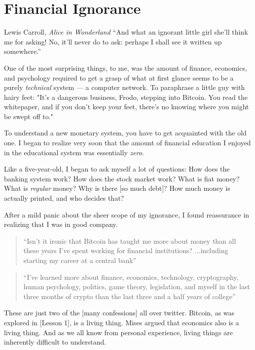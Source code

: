 \chapter{Financial Ignorance}
\label{les:8}

\begin{chapquote}{Lewis Carroll, \textit{Alice in Wonderland}}
``And what an ignorant little girl she'll think me for asking! No, it'll never
do to ask: perhaps I shall see it written up somewhere.''
\end{chapquote}

One of the most surprising things, to me, was the amount of finance,
economics, and psychology required to get a grasp of what at first
glance seems to be a purely \textit{technical} system --- a computer network.
To paraphrase a little guy with hairy feet: "It's a dangerous business,
Frodo, stepping into Bitcoin. You read the whitepaper, and if you don't
keep your feet, there's no knowing where you might be swept off to."

To understand a new monetary system, you have to get acquainted with the
old one. I began to realize very soon that the amount of financial
education I enjoyed in the educational system was essentially \textit{zero}.

Like a five-year-old, I began to ask myself a lot of questions: How does
the banking system work? How does the stock market work? What is fiat
money? What is \textit{regular} money? Why is there [so much debt]? How much
money is actually printed, and who decides that?

After a mild panic about the sheer scope of my ignorance, I found
reassurance in realizing that I was in good company.

\begin{quotation}
``Isn't it ironic that Bitcoin has taught me more about money than all
these years I've spent working for financial
institutions? ...including starting my career at a central
bank''
\end{quotation}

\begin{quotation}
``I've learned more about finance, economics, technology, cryptography,
human psychology, politics, game theory, legislation, and myself in
the last three months of crypto than the last three and a half years
of college''
\end{quotation}

These are just two of the [many confessions] all over twitter. Bitcoin,
as was explored in [Lesson 1], is a living thing. Mises argued that
economics also is a living thing. And as we all know from personal
experience, living things are inherently difficult to understand.

